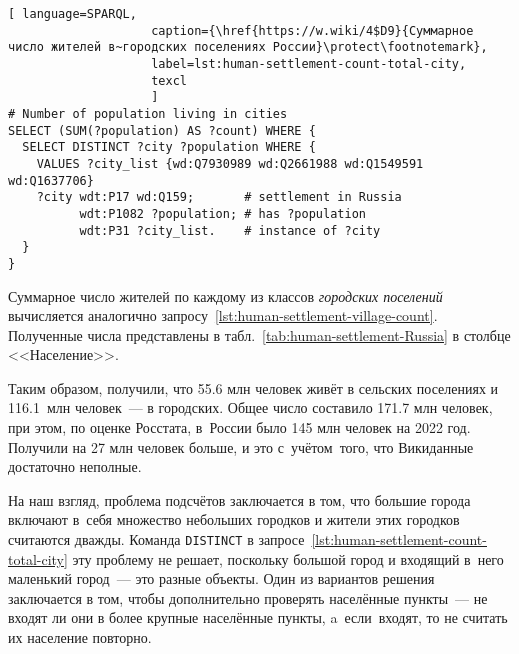 \begin{lstlisting}[ language=SPARQL, 
                    caption={\href{https://w.wiki/4$D9}{Суммарное число жителей в~городских поселениях России}\protect\footnotemark},
                    label=lst:human-settlement-count-total-city,
                    texcl 
                    ]
# Number of population living in cities
SELECT (SUM(?population) AS ?count) WHERE {  
  SELECT DISTINCT ?city ?population WHERE {  
    VALUES ?city_list {wd:Q7930989 wd:Q2661988 wd:Q1549591 wd:Q1637706}
    ?city wdt:P17 wd:Q159;       # settlement in Russia
          wdt:P1082 ?population; # has ?population
          wdt:P31 ?city_list.    # instance of ?city
  }
}
\end{lstlisting}%

Суммарное число жителей по каждому из классов \emph{городских поселений} 
вычисляется аналогично запросу~\ref{lst:human-settlement-village-count}. 
Полученные числа представлены в табл.~\ref{tab:human-settlement-Russia} в столбце <<Население>>. 

Таким образом, получили, что \num{55.6} млн человек живёт в сельских поселениях и \num{116.1}~млн человек~--- в городских. 
Общее число составило \num{171.7} млн человек, 
при этом, по оценке Росстата, в~России было 145 млн человек на 2022 год. 
Получили на 27 млн человек больше, и это с~учётом~того, что Викиданные достаточно неполные. 

На наш взгляд, проблема подсчётов заключается в том, 
что большие города включают в~себя множество небольших городков и жители этих городков считаются дважды. 
Команда \lstinline|DISTINCT|%
%
%
%
%
в запросе~\ref{lst:human-settlement-count-total-city} 
эту проблему не решает, поскольку большой город и входящий в~него маленький город~--- это разные объекты. 
Один из вариантов решения заключается в том, 
чтобы дополнительно проверять населённые пункты~---  
не входят ли они в более крупные населённые пункты, 
a~если~входят, то не считать их население повторно. 



